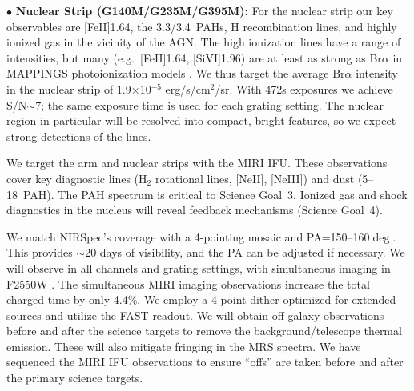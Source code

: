\documentclass[12pt]{article}
\begin{document}
\noindent $\bullet$ {\bf Nuclear Strip (G140M/G235M/G395M):} For the nuclear strip our key observables are [Fe{\small II}]1.64\micron, the 3.3/3.4\micron\ PAHs, H recombination lines, and highly ionized gas in the vicinity of the AGN.  The high ionization lines have a range of intensities, but many (e.g.\ [Fe{\small II}]1.64\micron, [Si{\small VI}]1.96\micron) are at least as strong as Br$\alpha$ 
in MAPPINGS photoionization models \citep{groves2006}. We thus target the average Br$\alpha$ intensity in the nuclear strip of 1.9$\times$10$^{-5}$ erg/s/cm$^2$/sr.  With 472s exposures we achieve S/N$\sim$7; the same exposure time is used for each grating setting. The nuclear region in particular will be resolved into compact, bright features, so we expect strong detections of the lines.

\vspace{0.1in}

 We target the arm and nuclear strips with the MIRI IFU.  These observations cover key diagnostic lines (H$_2$ rotational lines, [Ne{\small II}], [Ne{\small III}]) and dust (5--18\micron\ PAH). The PAH spectrum is critical to Science Goal~3. Ionized gas and shock diagnostics in the nucleus will reveal feedback mechanisms (Science Goal~4). 

We match NIRSpec's coverage with a 4-pointing mosaic and PA=150--160$\deg$. This provides $\sim$20 days of visibility, and the PA can be adjusted if necessary.  We will observe in all channels and grating settings, with simultaneous imaging in F2550W 
\citep[to study hot dust in star-forming regions:][]{calzetti2005,dale2017}. The simultaneous MIRI imaging observations increase the total charged time by only 4.4\%. We employ a 4-point dither optimized for extended sources and utilize the FAST readout. We will obtain off-galaxy observations before and after the science targets to remove the background/telescope thermal emission.  These will also mitigate fringing in the MRS spectra.  We have sequenced the MIRI IFU observations to ensure ``offs'' are taken before and after the primary science targets.

\vspace{0.05in}
\end{document}
